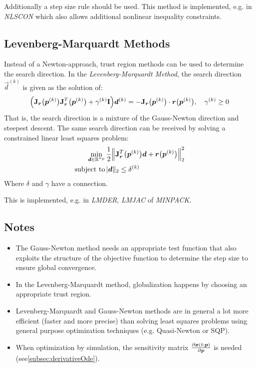 			Additionally a step size rule should be used. This method is implemented, e.g. in \emph{NLSCON} which also allows additional nonlinear inequality constraints.

		\subsection{Levenberg-Marquardt Methods}
			Instead of a Newton-approach, trust region methods can be used to determine the search direction. In the \emph{Levenberg-Marquardt Method}, the search direction \(\vec{d}^{(k)}\) is given as the solution of:
			\begin{align*}
				\Big( \bm{\mathrm{J}}_{\bm{r}}\big(\bm{p}^{(k)}\big) \bm{\mathrm{J}}_{\bm{r}}^T\big(\bm{p}^{(k)}\big) + \gamma^{(k)} \bm{\mathrm{I}} \Big) \bm{d}^{(k)} = -\bm{\mathrm{J}}_{\bm{r}}\big(\bm{p}^{(k)}\big) \cdot \bm{r}\big(\bm{p}^{(k)}\big),\quad \gamma^{(k)} \geq 0
			\end{align*}
			That is, the search direction is a mixture of the Gauss-Newton direction and steepest descent. The same search direction can be received by solving a constrained linear least squares problem:
			\begin{align*}
				\min_{\bm{d} \in \mathbb{R}^{n_p}} & \, \frac{1}{2} \Big\lVert \bm{\mathrm{J}}_{\bm{r}}^T\big(\bm{p}^{(k)}\big) \bm{d} + \bm{r}\big(\bm{p}^{(k)}\big) \Big\rVert_2^2 \\
				\mathrm{subject~to}         & \,
				\lvert \bm{d} \rVert_2 \leq \delta^{(k)}
			\end{align*}
			Where \(\delta\) and \(\gamma\) have a connection.

			This is implemented, e.g. in \emph{LMDER}, \emph{LMJAC} of \emph{MINPACK}.

		\subsection{Notes}
			\begin{itemize}
				\item The Gauss-Newton method needs an appropriate test function that also exploits the structure of the objective function to determine the step size to ensure global convergence.
				\item In the Levenberg-Marquardt method, globalization happens by choosing an appropriate trust region.
				\item Levenberg-Marquardt and Gauss-Newton methods are in general a lot more efficient (faster and more precise) than solving least squares problems using general purpose optimization techniques (e.g. Quasi-Newton or SQP).
				\item When optimization by simulation, the sensitivity matrix \( \pdv{\bm{x}(t; \bm{p})}{\bm{p}} \) is needed (see\autoref{subsec:derivativeOde}).
			\end{itemize}

